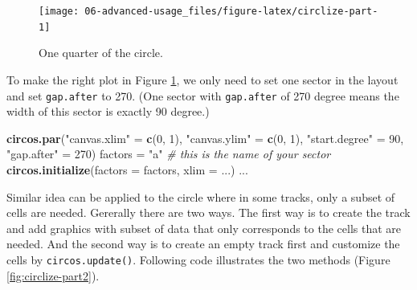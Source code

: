 \documentclass[]{book}
\newenvironment{Shaded}{\begin{snugshade}}{\end{snugshade}}
\newcommand{\KeywordTok}[1]{\textcolor[rgb]{0.13,0.29,0.53}{\textbf{#1}}}
\newcommand{\DataTypeTok}[1]{\textcolor[rgb]{0.13,0.29,0.53}{#1}}
\newcommand{\DecValTok}[1]{\textcolor[rgb]{0.00,0.00,0.81}{#1}}
\newcommand{\StringTok}[1]{\textcolor[rgb]{0.31,0.60,0.02}{#1}}
\newcommand{\CommentTok}[1]{\textcolor[rgb]{0.56,0.35,0.01}{\textit{#1}}}
\newcommand{\NormalTok}[1]{#1}
\begin{document}
\begin{figure}

{\centering \texttt{[image: 06-advanced-usage\_files/figure-latex/circlize-part-1]} 

}

\caption{One quarter of the circle.}\label{fig:circlize-part}
\end{figure}

To make the right plot in Figure \ref{fig:circlize-part}, we only need
to set one sector in the layout and set \texttt{gap.after} to 270. (One
sector with \texttt{gap.after} of 270 degree means the width of this
sector is exactly 90 degree.)

\begin{Shaded}
\begin{Highlighting}[]
\KeywordTok{circos.par}\NormalTok{(}\StringTok{"canvas.xlim"}\NormalTok{ =}\StringTok{ }\KeywordTok{c}\NormalTok{(}\DecValTok{0}\NormalTok{, }\DecValTok{1}\NormalTok{), }\StringTok{"canvas.ylim"}\NormalTok{ =}\StringTok{ }\KeywordTok{c}\NormalTok{(}\DecValTok{0}\NormalTok{, }\DecValTok{1}\NormalTok{),}
    \StringTok{"start.degree"}\NormalTok{ =}\StringTok{ }\DecValTok{90}\NormalTok{, }\StringTok{"gap.after"}\NormalTok{ =}\StringTok{ }\DecValTok{270}\NormalTok{)}
\NormalTok{factors =}\StringTok{ "a"} \CommentTok{# this is the name of your sector}
\KeywordTok{circos.initialize}\NormalTok{(}\DataTypeTok{factors =}\NormalTok{ factors, }\DataTypeTok{xlim =}\NormalTok{ ...)}
\NormalTok{...}
\end{Highlighting}
\end{Shaded}

Similar idea can be applied to the circle where in some tracks, only a
subset of cells are needed. Gererally there are two ways. The first way
is to create the track and add graphics with subset of data that only
corresponds to the cells that are needed. And the second way is to
create an empty track first and customize the cells by
\texttt{circos.update()}. Following code illustrates the two methods
(Figure \ref{fig:circlize-part2}).
\end{document}
